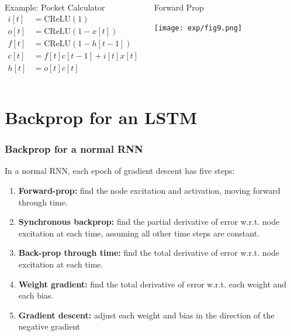 \documentclass{beamer}
\begin{document}
\begin{frame}
  \begin{columns}
    \column{2in}
    \begin{block}{Example: Pocket Calculator}
      \begin{align*}
        i[t] &=\mbox{CReLU}(1)\\
        o[t] &=\mbox{CReLU}(1-x[t])\\
        f[t] &=\mbox{CReLU}(1-h[t-1])\\
        c[t] &=f[t]c[t-1]+i[t]x[t]\\
        h[t] &=o[t]c[t]
      \end{align*}
    \end{block}
    \column{2.25in}
    \begin{block}{Forward Prop}
      \centerline{\texttt{[image: exp/fig9.png]}}
    \end{block}
    \end{columns}
\end{frame}

\section[Backprop]{Backprop for an LSTM}
\setcounter{subsection}{1}

\begin{frame}
  \frametitle{Backprop for a normal RNN}
  In a normal RNN, each epoch of gradient descent has five steps:
  \begin{enumerate}
    \item {\bf Forward-prop:} find the node excitation and activation,
      moving forward through time.
    \item {\bf Synchronous backprop:} find the partial derivative of
      error w.r.t. node excitation at each time, assuming all other
      time steps are constant.
    \item {\bf Back-prop through time:} find the total derivative of
      error w.r.t. node excitation at each time.
    \item {\bf Weight gradient:} find the total derivative of error
      w.r.t. each weight and each bias.
    \item {\bf Gradient descent:} adjust each weight and bias in the direction
      of the negative gradient
  \end{enumerate}
\end{frame}
\end{document}
